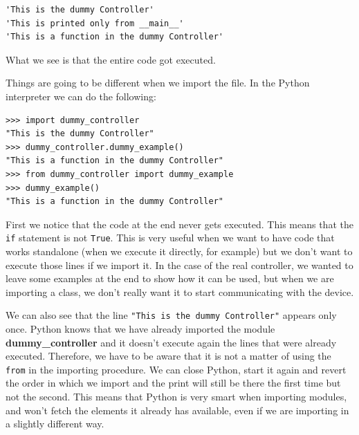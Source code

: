\begin{verbatim}
'This is the dummy Controller'
'This is printed only from __main__'
'This is a function in the dummy Controller'
\end{verbatim}

What we see is that the entire code got executed.


Things are going to be different when we import the file. In the Python interpreter we can do the following:

\begin{verbatim}
>>> import dummy_controller
"This is the dummy Controller"
>>> dummy_controller.dummy_example()
"This is a function in the dummy Controller"
>>> from dummy_controller import dummy_example
>>> dummy_example()
"This is a function in the dummy Controller"
\end{verbatim}

First we notice that the code at the end never gets executed. This means that the \texttt{if} statement is not \texttt{True}. This is very useful when we want to have code that works standalone (when we execute it directly, for example) but we don't want to execute those lines if we import it. In the case of the real controller, we wanted to leave some examples at the end to show how it can be used, but when we are importing a class, we don't really want it to start communicating with the device.

We can also see that the line \texttt{"This is the dummy Controller"} appears only once. Python knows that we have already imported the module \textbf{dummy\_controller} and it doesn't execute again the lines that were already executed. Therefore, we have to be aware that it is not a matter of using the \texttt{from} in the importing procedure. We can close Python, start it again and revert the order in which we import and the print will still be there the first time but not the second. This means that Python is very smart when importing modules, and won't fetch the elements it already has available, even if we are importing in a slightly different way.


